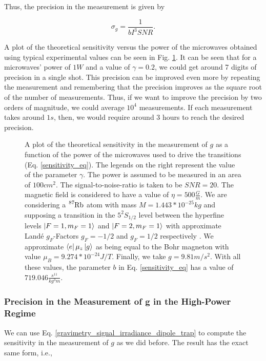 \documentclass{article}
\begin{document}
Thus, the precision in the measurement is given by

\begin{equation}\label{precision_eq}
    \sigma_{g} = \frac{1}{b I^3 SNR}.
\end{equation}

A plot of the theoretical sensitivity versus the power of the microwaves obtained using typical experimental values can be seen in Fig. \ref{precision_vs_power_figure}. It can be seen that for a microwaves' power of $1W$ and a value of $\gamma=0.2$, we could get around 7 digits of precision in a single shot. This precision can be improved even more by repeating the measurement and remembering that the precision improves as the square root of the number of measurements\cite{Bevington_Robinson_Blair_Mallinckrodt_McKay_1993}. Thus, if we want to improve the precision by two orders of magnitude, we could average $10^{4}$ measurements. If each measurement takes around $1s$, then, we would require around $3$ hours to reach the desired precision.

\begin{figure}
    \centering
    
    \caption{A plot of the theoretical sensitivity in the measurement of $g$ as a function of the power of the microwaves used to drive the transitions (Eq. \ref{sensitivity_eq}). The legends on the right represent the value of the parameter $\gamma$. The power is assumed to be measured in an area of $100cm^2$. The signal-to-noise-ratio is taken to be $SNR=20$. The magnetic field is considered to have a value of $\eta = 500 \frac{G}{m}$. We are considering a $\ce{^{87}_{}Rb}$ atom with mass $M=1.443*10^{-25}kg$ and supposing a transition in the $5^{2}S_{1/2}$ level between the hyperfine levels $\ket{F=1, m_{F}=1}$ and $\ket{F=2, m_{F}=1}$ with approximate Landé $g_{F}$-Factors $g_{F}=-1/2$ and $g_{F}=1/2$ respectively \cite{Steck2010}. We approximate $\bra{e} \mu_{z} \ket{g}$ as being equal to the Bohr magneton with value $\mu_{B}=9.274*10^{-24}J/T$. Finally, we take $g=9.81 m/s^2$. With all these values, the parameter $b$ in Eq. \ref{sensitivity_eq} has a value of $719.046 \frac{s^{11}}{kg^{3}m}$.}
    \label{precision_vs_power_figure}
\end{figure}

\subsubsection{Precision in the Measurement of g in the High-Power Regime}
We can use Eq. \ref{gravimetry_signal_irradiance_dipole_trap} to compute the sensitivity in the measurement of $g$ as we did before. The result has the exact same form, i.e.,
\end{document}
